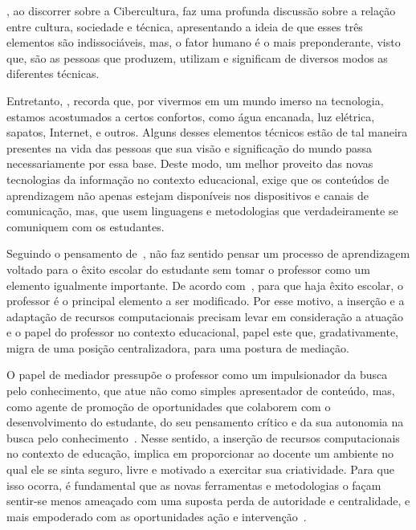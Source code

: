 \cite{Levy:2010}, ao discorrer sobre a Cibercultura, faz uma profunda discussão sobre a relação entre cultura, sociedade e técnica, apresentando a ideia de que esses três elementos são indissociáveis, mas, o fator humano é o mais preponderante, visto que, são as pessoas que produzem, utilizam e significam de diversos modos as diferentes técnicas.

Entretanto, \cite{Kenski:2007}, recorda que, por vivermos em um mundo imerso na tecnologia, estamos acostumados a certos confortos, como água encanada, luz elétrica, sapatos, Internet, e outros. Alguns desses elementos técnicos estão de tal maneira presentes na vida das pessoas que sua visão e significação do mundo passa necessariamente por essa base. Deste modo, um melhor proveito das novas tecnologias da informação no contexto educacional, exige que os conteúdos de aprendizagem não apenas estejam disponíveis nos dispositivos e canais de comunicação, mas, que usem linguagens e metodologias que verdadeiramente se comuniquem com os estudantes.

Seguindo o pensamento de~\cite{bassedas:1996}, não faz sentido pensar um processo de aprendizagem voltado para o êxito escolar do estudante sem tomar o professor como um elemento igualmente importante. De acordo com~\cite{Perrenoud:2001}, para que haja êxito escolar, o professor é o principal elemento a ser modificado. Por esse motivo, a inserção e a adaptação de recursos computacionais precisam levar em consideração a atuação e o papel do professor no contexto educacional, papel este que, gradativamente, migra de uma posição centralizadora, para uma postura de mediação.

O papel de mediador pressupõe o professor como um impulsionador da busca pelo conhecimento, que atue não como simples apresentador de conteúdo, mas, como agente de promoção de oportunidades que colaborem com o desenvolvimento do estudante, do seu pensamento crítico e da sua autonomia na busca pelo conhecimento~\citep{Chiovatto:2000}. Nesse sentido, a inserção de recursos computacionais no contexto de educação, implica em proporcionar ao docente um ambiente no qual ele se sinta seguro, livre e motivado a exercitar sua criatividade. Para que isso ocorra, é fundamental que as novas ferramentas e metodologias o façam sentir-se menos ameaçado com uma suposta perda de autoridade e centralidade, e mais empoderado com as oportunidades ação e intervenção~\citep{Perrenoud:2001}.


